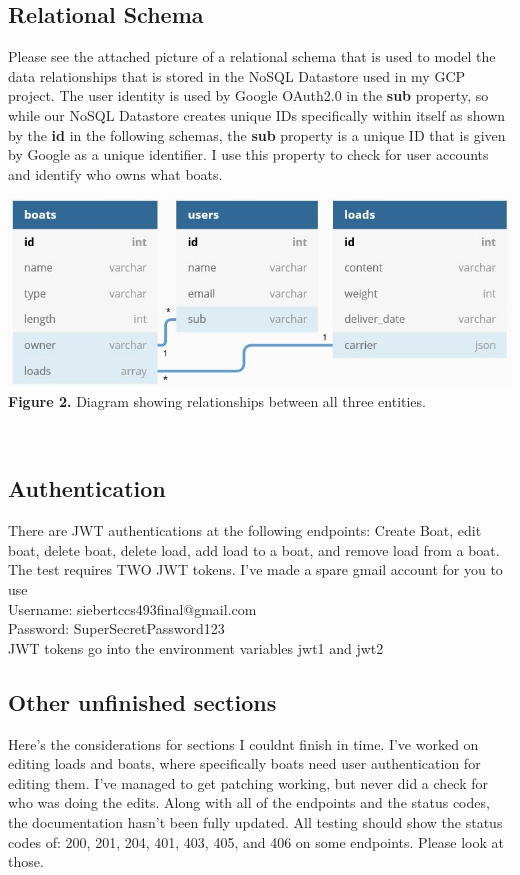 \documentclass[letterpaper,11pt,titlepage,draftclsnofoot,onecolumn,compsoc,utf8,latin1]{IEEEtran}
\begin{document}
\begin{singlespace}
\subsection{Relational Schema}
Please see the attached picture of a relational schema that is used to model the data relationships that is stored in the NoSQL Datastore used in my GCP project. The user identity is used by Google OAuth2.0 in the \textbf{sub} property, so while our NoSQL Datastore creates unique IDs specifically within itself as shown by the \textbf{id} in the following schemas, the \textbf{sub} property is a unique ID that is given by Google as a unique identifier. I use this property to check for user accounts and identify who owns what boats.

\begin{center}
\includegraphics[width=.8\textwidth]{relationalschema.JPG}\\
\caption{\textbf{Figure 2. } Diagram showing relationships between all three entities.}\\
\end{center}

\subsection{Authentication}
There are JWT authentications at the following endpoints: Create Boat, edit boat, delete boat, delete load, add load to a boat, and remove load from a boat. \\

The test requires TWO JWT tokens. I've made a spare gmail account for you to use\\
Username: siebertccs493final@gmail.com\\
Password: SuperSecretPassword123\\

JWT tokens go into the environment variables jwt1 and jwt2\\

\subsection{Other unfinished sections}
Here's the considerations for sections I couldnt finish in time. I've worked on editing loads and boats, where specifically boats need user authentication for editing them. I've managed to get patching working, but never did a check for who was doing the edits. Along with all of the endpoints and the status codes, the documentation hasn't been fully updated. All testing should show the status codes of: 200, 201, 204, 401, 403, 405, and 406 on some endpoints. Please look at those.\\


\end{singlespace}
\end{document}
